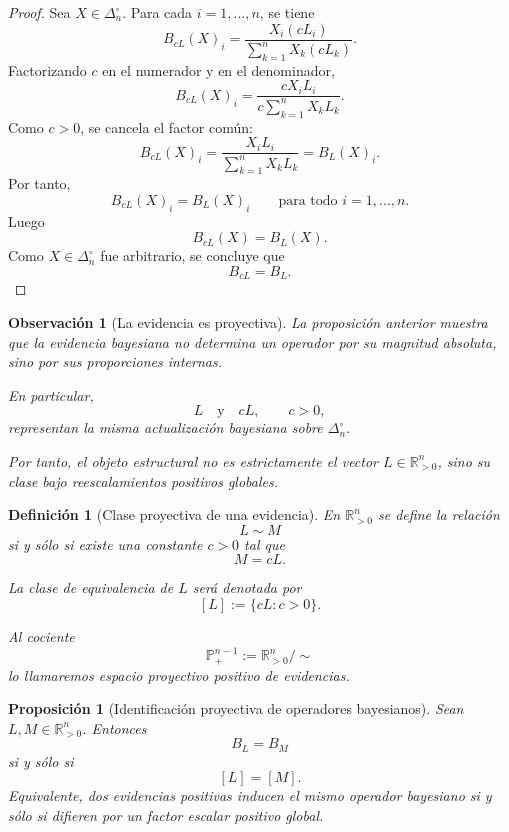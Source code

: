 \documentclass[12pt]{article}
\newtheorem{definicion}{Definición}[section]
\newtheorem{proposicion}{Proposición}[section]
\newtheorem{observacion}{Observación}[section]
\begin{document}
\begin{proof}
Sea \(X\in\Delta_n^\circ\). Para cada \(i=1,\dots,n\), se tiene
\[
B_{cL}(X)_i
=
\frac{X_i(cL_i)}
{\sum_{k=1}^{n}X_k(cL_k)}.
\]
Factorizando \(c\) en el numerador y en el denominador,
\[
B_{cL}(X)_i
=
\frac{cX_iL_i}
{c\sum_{k=1}^{n}X_kL_k}.
\]
Como \(c>0\), se cancela el factor común:
\[
B_{cL}(X)_i
=
\frac{X_iL_i}
{\sum_{k=1}^{n}X_kL_k}
=
B_L(X)_i.
\]
Por tanto,
\[
B_{cL}(X)_i=B_L(X)_i
\qquad
\text{para todo } i=1,\dots,n.
\]
Luego
\[
B_{cL}(X)=B_L(X).
\]
Como \(X\in\Delta_n^\circ\) fue arbitrario, se concluye que
\[
B_{cL}=B_L.
\]
\end{proof}

\begin{observacion}[La evidencia es proyectiva]
La proposición anterior muestra que la evidencia bayesiana no determina un operador por su
magnitud absoluta, sino por sus proporciones internas.

En particular,
\[
L
\quad\text{y}\quad
cL,
\qquad c>0,
\]
representan la misma actualización bayesiana sobre \(\Delta_n^\circ\).

Por tanto, el objeto estructural no es estrictamente el vector \(L\in\mathbb{R}_{>0}^{n}\),
sino su clase bajo reescalamientos positivos globales.
\end{observacion}


\begin{definicion}[Clase proyectiva de una evidencia]
En \(\mathbb{R}_{>0}^{n}\) se define la relación
\[
L\sim M
\]
si y sólo si existe una constante \(c>0\) tal que
\[
M=cL.
\]

La clase de equivalencia de \(L\) será denotada por
\[
[L]
:=
\{cL:c>0\}.
\]

Al cociente
\[
\mathbb{P}^{n-1}_{+}
:=
\mathbb{R}_{>0}^{n}/\sim
\]
lo llamaremos \emph{espacio proyectivo positivo de evidencias}.
\end{definicion}

\begin{proposicion}[Identificación proyectiva de operadores bayesianos]
Sean \(L,M\in\mathbb{R}_{>0}^{n}\). Entonces
\[
B_L=B_M
\]
si y sólo si
\[
[L]=[M].
\]
Equivalente, dos evidencias positivas inducen el mismo operador bayesiano si y sólo si
difieren por un factor escalar positivo global.
\end{proposicion}
\end{document}
